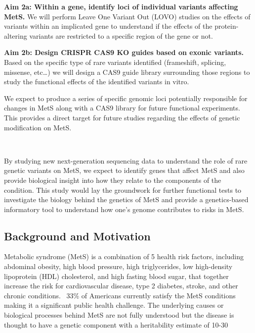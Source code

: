 \documentclass[11pt]{article}
\begin{document}
\textbf{Aim 2a: Within a gene, identify loci of individual variants affecting MetS.} We will perform Leave One Variant Out (LOVO) studies on the effects of variants within an implicated gene to understand if the effects of the protein-altering variants are restricted to a specific region of the gene or not.

\textbf{Aim 2b: Design CRISPR CAS9 KO guides based on exonic variants.} Based on the specific type of rare variants identified (frameshift, splicing, missense, etc…) we will design a CAS9 guide library surrounding those regions to study the functional effects of the identified variants in vitro.

We expect to produce a series of specific genomic loci potentially responsible for changes in MetS along with a CAS9 library for future functional experiments. This provides a direct target for future studies regarding the effects of genetic modification on MetS.

\

By studying new next-generation sequencing data to understand the role of rare genetic variants on MetS, we expect to identify genes that affect MetS and also provide biological insight into how they relate to the components of the condition. This study would lay the groundwork for further functional tests to investigate the biology behind the genetics of MetS and provide a genetics-based informatory tool to understand how one's genome contributes to risks in MetS.

\newpage

\subsection*{Background and Motivation}

Metabolic syndrome (MetS) is a combination of 5 health risk factors, including abdominal obesity, high blood pressure, high triglycerides, low high-density lipoprotein (HDL) cholesterol, and high fasting blood sugar, that together increase the risk for cardiovascular disease, type 2 diabetes, stroke, and other chronic conditions. ~33\% of Americans currently satisfy the MetS conditions making it a significant public health challenge. The underlying causes or biological processes behind MetS are not fully understood but the disease is thought to have a genetic component with a heritability estimate of 10-30%
\end{document}
